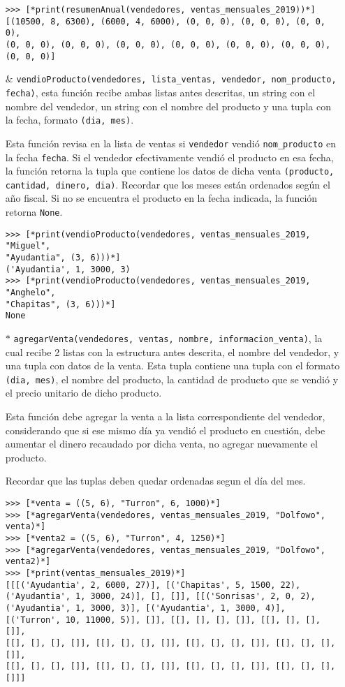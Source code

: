 \begin{enumerate}
\begin{lstlisting}[style=consola]
>>> [*print(resumenAnual(vendedores, ventas_mensuales_2019))*]
[(10500, 8, 6300), (6000, 4, 6000), (0, 0, 0), (0, 0, 0), (0, 0, 0), 
(0, 0, 0), (0, 0, 0), (0, 0, 0), (0, 0, 0), (0, 0, 0), (0, 0, 0), (0, 0, 0)]
\end{lstlisting}


\item[$\&$] \texttt{vendioProducto(vendedores, lista\_ventas, vendedor, nom\_producto, fecha)}, esta función recibe ambas listas antes descritas, un string con el nombre del vendedor, un string con el nombre del producto y una tupla con la fecha, formato \texttt{(dia, mes)}.

    Esta función revisa en la lista de ventas si \texttt{vendedor} vendió \texttt{nom\_producto} en la fecha \texttt{fecha}. Si el vendedor efectivamente vendió el producto en esa fecha, la función retorna la tupla que contiene los datos de dicha venta \texttt{(producto, cantidad, dinero, dia)}. Recordar que los meses están ordenados según el año fiscal. Si no se encuentra el producto en la fecha indicada, la función retorna \texttt{None}.

\begin{lstlisting}[style=consola]
>>> [*print(vendioProducto(vendedores, ventas_mensuales_2019, "Miguel", 
"Ayudantia", (3, 6)))*]
('Ayudantia', 1, 3000, 3)
>>> [*print(vendioProducto(vendedores, ventas_mensuales_2019, "Anghelo",
"Chapitas", (3, 6)))*]
None
\end{lstlisting}

    \item[$*$] \texttt{agregarVenta(vendedores, ventas, nombre, informacion\_venta)}, la cual recibe 2 listas con la estructura antes descrita, el nombre del vendedor, y una tupla con datos de la venta. Esta tupla contiene una tupla con el formato \texttt{(dia, mes)}, el nombre del producto, la cantidad de producto que se vendió y el precio unitario de dicho producto.
    
    Esta función debe agregar la venta a la lista correspondiente del vendedor, considerando que si ese mismo día ya vendió el producto en cuestión, debe aumentar el dinero recaudado por dicha venta, no agregar nuevamente el producto.
    
    Recordar que las tuplas deben quedar ordenadas segun el día del mes.

\begin{lstlisting}[style=consola]
>>> [*venta = ((5, 6), "Turron", 6, 1000)*]
>>> [*agregarVenta(vendedores, ventas_mensuales_2019, "Dolfowo", venta)*]
>>> [*venta2 = ((5, 6), "Turron", 4, 1250)*]
>>> [*agregarVenta(vendedores, ventas_mensuales_2019, "Dolfowo", venta2)*]
>>> [*print(ventas_mensuales_2019)*]
[[[('Ayudantia', 2, 6000, 27)], [('Chapitas', 5, 1500, 22), 
('Ayudantia', 1, 3000, 24)], [], []], [[('Sonrisas', 2, 0, 2),
('Ayudantia', 1, 3000, 3)], [('Ayudantia', 1, 3000, 4)],
[('Turron', 10, 11000, 5)], []], [[], [], [], []], [[], [], [], []], 
[[], [], [], []], [[], [], [], []], [[], [], [], []], [[], [], [], []],
[[], [], [], []], [[], [], [], []], [[], [], [], []], [[], [], [], []]]
\end{lstlisting}


\end{enumerate}

